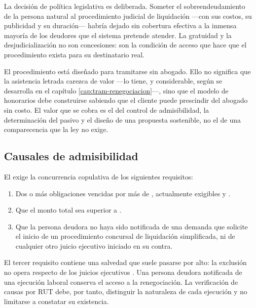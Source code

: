 La decisión de política legislativa es deliberada. Someter el sobreendeudamiento de la
persona natural al procedimiento judicial de liquidación ---con sus costos, su publicidad
y su duración--- habría dejado sin cobertura efectiva a la inmensa mayoría de los deudores
que el sistema pretende atender. La gratuidad y la desjudicialización no son concesiones:
son la condición de acceso que hace que el procedimiento exista para su destinatario real.

\begin{foco}
El procedimiento está diseñado para tramitarse sin abogado. Ello no significa que la
asistencia letrada carezca de valor ---lo tiene, y considerable, según se desarrolla en el
capítulo \ref{cap:tram-renegociacion}---, sino que el modelo de honorarios debe construirse
sabiendo que el cliente puede prescindir del abogado sin costo. El valor que se cobra es el
del control de admisibilidad, la determinación del pasivo y el diseño de una propuesta
sostenible, no el de una comparecencia que la ley no exige.
\end{foco}

\bloqueNormativo

\subsection{Causales de admisibilidad}

El  \parencite{ley-20720} exige la concurrencia copulativa de los siguientes
requisitos:

\begin{enumerate}
  \item Dos o más obligaciones vencidas por más de ,
  actualmente exigibles y .
  \item Que el monto total sea superior a .
  \item Que la persona deudora no haya sido notificada de una demanda que solicite el
  inicio de un procedimiento concursal de liquidación simplificada, ni de cualquier otro
  juicio ejecutivo iniciado en su contra.
\end{enumerate}

\begin{foco}
El tercer requisito contiene una salvedad que suele pasarse por alto: la exclusión no
opera respecto de los juicios ejecutivos . Una persona
deudora notificada de una ejecución laboral conserva el acceso a la renegociación. La
verificación de causas por RUT debe, por tanto, distinguir la naturaleza de cada
ejecución y no limitarse a constatar su existencia.
\end{foco}

